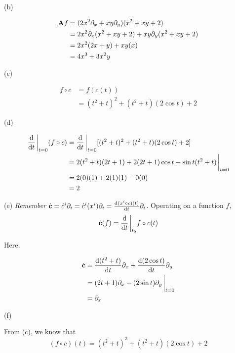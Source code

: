 \documentclass[11pt]{article}
\begin{document}
\begin{enumerate}[start=1,label={\bfseries Exercise \arabic*:},leftmargin=1in]
        \noindent (b)

        \begin{align*}
            \vb{A}f &= (2x^2\partial_x + xy\partial_y)(x^2 + xy + 2) \\
                    &= 2x^2 \partial_x(x^2 + xy + 2) + xy \partial_y (x^2 + xy + 2) \\
                    &= 2x^2(2x+y) + xy(x) \\
                    &= 4x^3 + 3x^2y
        \end{align*}

        \noindent (c)

        \begin{align*}
            f \circ c &= f(c(t)) \\
                      &= (t^2 + t)^2 + (t^2 + t)(2\cos{t}) + 2
        \end{align*}

        \noindent (d)

        \begin{align*}
            \dv{t} \eval_{t=0} (f \circ c) &= \dv{t} \eval_{t=0} [(t^2 + t)^2 + (t^2 + t)(2\cos{t}) + 2 ] \\
                                                 &= 2(t^2 + t)(2t+1) + 2(2t+1)\cos{t} - \sin{t}(t^2 + t) \eval_{t=0} \\
                                                 &= 2(0)(1) + 2(1)(1) - 0(0) \\
                                                 &= 2
        \end{align*}

        \noindent (e) \emph{Remember} \(\dot{\vb{c}} = \dot{c}^i \partial_i = \dot{c}^i(x^i)\partial_i = \dv{(x^i \circ c)(t)}{t} \partial_i\). Operating on a function \(f\), \[\dot{\vb{c}}(f) = \dv{t}\eval_{t_0} f \circ c(t)\]

        \noindent Here,


        \begin{align*}
              \dot{\vb{c}} &= \dv{(t^2+t)}{t} \partial_x + \dv{(2\cos{t})}{t} \partial_y \\
                           &= (2t+1)\partial_x - (2\sin{t})\partial_y \eval_{t=0} \\
                           &= \partial_x
        \end{align*}


        \noindent (f)

        \noindent From (c), we know that \[(f\circ c) (t) = (t^2+t)^2 + (t^2+t)(2\cos{t}) + 2 \]


\end{enumerate}
\end{document}
